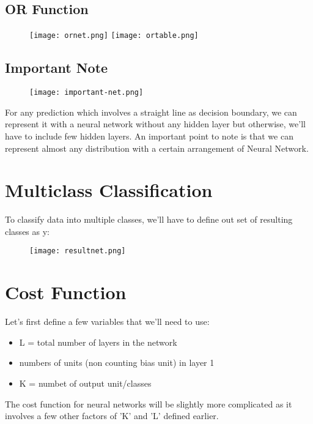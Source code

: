     \subsection{OR Function}
      \begin{figure}[h]
        \centering
        \texttt{[image: ornet.png]}
        \texttt{[image: ortable.png]}
      \end{figure}

    \subsection{Important Note}
      \begin{figure}[h]
        \centering
        \texttt{[image: important-net.png]}
      \end{figure}

      For any prediction which involves a straight line as decision boundary, we can represent it with a neural network without any hidden layer but otherwise, we'll have to include few hidden layers. An important point to note is that we can represent almost any distribution with a certain arrangement of Neural Network.

  \section{Multiclass Classification}
    To classify data into multiple classes, we'll have to define out set of resulting classes as y:
    \begin{figure}[h]
      \centering
      \texttt{[image: resultnet.png]}
    \end{figure}

  \section{Cost Function}
    Let's first define a few variables that we'll need to use:
    
    \begin{itemize}
      \item L = total number of layers in the network
      \item numbers of units (non counting bias unit) in layer 1
      \item K = numbet of output unit/classes
    \end{itemize}

    The cost function for neural networks will be slightly more complicated as it involves a few other factors of 'K' and 'L' defined earlier.

